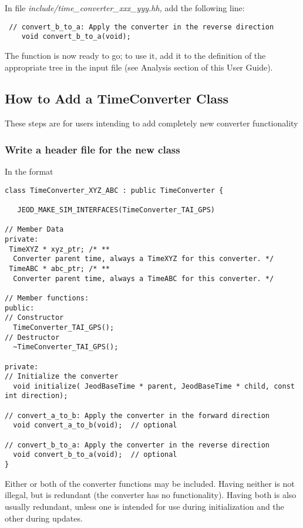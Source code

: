 In file \textit{include/time\_converter\_xxx\_yyy.hh, }add the following
line:

\begin{verbatim}
 // convert_b_to_a: Apply the converter in the reverse direction
    void convert_b_to_a(void);
\end{verbatim}

The function is now ready to go; to use it, add it to the definition of
the appropriate tree in the input file (see Analysis section of this
User Guide).







\subsection{How to Add a TimeConverter Class}
These steps are for users intending to add completely new converter
functionality

\subsubsection{Write a header file for the new class}
In the format

\begin{verbatim}
class TimeConverter_XYZ_ABC : public TimeConverter {
 
   JEOD_MAKE_SIM_INTERFACES(TimeConverter_TAI_GPS)
 
// Member Data
private: 
 TimeXYZ * xyz_ptr; /* ** 
  Converter parent time, always a TimeXYZ for this converter. */
 TimeABC * abc_ptr; /* ** 
  Converter parent time, always a TimeABC for this converter. */

// Member functions:
public: 
// Constructor
  TimeConverter_TAI_GPS();
// Destructor
  ~TimeConverter_TAI_GPS();

private:
// Initialize the converter
  void initialize( JeodBaseTime * parent, JeodBaseTime * child, const int direction);

// convert_a_to_b: Apply the converter in the forward direction
  void convert_a_to_b(void);  // optional

// convert_b_to_a: Apply the converter in the reverse direction
  void convert_b_to_a(void);  // optional
}
\end{verbatim} 

Either or both of the converter functions may be included.  Having
neither is not illegal, but is redundant (the converter has no
functionality).  Having both is also usually redundant, unless one is
intended for use during initialization and the other during updates.

